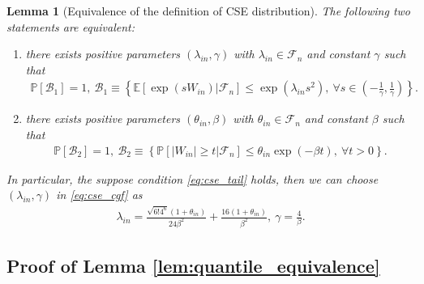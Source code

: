 \documentclass[12pt]{article}
\newtheorem{lemma}{Lemma}
\theoremstyle{definition}
\def\P{\mathbb{P}}
\def\P{\mathbb{P}}
\newcommand{\E}{\mathbb E}								%
\renewcommand{\P}{\mathbb{P}}							%
\begin{document}
  \begin{lemma}[Equivalence of the definition of CSE distribution]\label{lem:equivalence_CSE}
	  The following two statements are equivalent:
	  \begin{enumerate}
		  \item there exists positive parameters $(\lambda_{in},\gamma)$ with $\lambda_{in}\in\mathcal{F}_n$ and constant $\gamma$ such that 
		  \begin{align}\label{eq:cse_cgf}
			  \P\left[\mathcal{B}_1\right]=1,\ \mathcal{B}_1\equiv \left\{\E[\exp(sW_{in})|\mathcal{F}_n]\leq \exp(\lambda_{in}s^2),\ \forall s\in \left(-\frac{1}{\gamma},\frac{1}{\gamma}\right)\right\}.
		  \end{align}
		  \item there exists positive parameters $(\theta_{in},\beta)$ with $\theta_{in}\in\mathcal{F}_n$ and constant $\beta$ such that 
		  \begin{align}\label{eq:cse_tail}
			  \P\left[\mathcal{B}_2\right]=1,\ \mathcal{B}_2\equiv  \left\{\P\left[|W_{in}|\geq t|\mathcal{F}_n\right]\leq \theta_{in}\exp(-\beta t),\ \forall t>0\right\}.
		  \end{align}
	  \end{enumerate}
	  In particular, the suppose condition \eqref{eq:cse_tail} holds, then we can choose $(\lambda_{in},\gamma)$ in \eqref{eq:cse_cgf} as
	  \begin{align*}
		  \lambda_{in}= \frac{\sqrt{6!4^6}(1+\theta_{in})}{24\beta^2}+\frac{16(1+\theta_{in})}{\beta^2},\ \gamma=\frac{4}{\beta}.
	  \end{align*}
  \end{lemma}


\subsection{Proof of Lemma \ref{lem:quantile_equivalence}}
  
\end{document}
